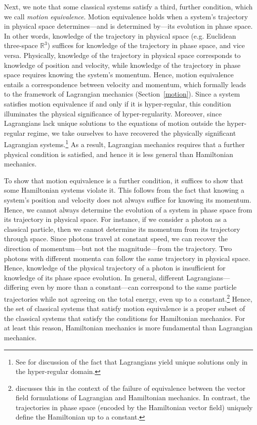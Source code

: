 \documentclass[12pt, twoside]{article}
\begin{document}
Next, we note that some classical systems satisfy a third, further condition, which we call \textit{motion equivalence}. Motion equivalence holds when a system's trajectory in physical space determines---and is determined by---its evolution in phase space. In other words, knowledge of the trajectory in physical space (e.g. Euclidean three-space $\mathbb{R}^3$) suffices for knowledge of the trajectory in phase space, and vice versa. Physically, knowledge of the trajectory in physical space corresponds to knowledge of position and velocity, while knowledge of the trajectory in phase space requires knowing the system's momentum. Hence, motion equivalence entails a correspondence between velocity and momentum, which formally leads to the framework of Lagrangian mechanics (Section~\ref{motion}). {\color{green} Since a system satisfies motion equivalence if and only if it is hyper-regular, this condition illuminates the physical significance of hyper-regularity. Moreover, since Lagrangians lack unique solutions to the equations of motion outside the hyper-regular regime, we take ourselves to have recovered the physically significant Lagrangian systems.}\footnote{{\color{green}See \textcites[119]{Gelfand} for discussion of the fact that Lagrangians yield unique solutions only in the hyper-regular domain.}} As a result, Lagrangian mechanics requires that a further physical condition is satisfied, and hence it is less general than Hamiltonian mechanics. 

To show that motion equivalence is a further condition, it suffices to show that some Hamiltonian systems violate it. This follows from the fact that knowing a system's position and velocity does not always suffice for knowing its momentum. Hence, we cannot always determine the evolution of a system in phase space from its trajectory in physical space. For instance, if we consider a photon as a classical particle, then we cannot determine its momentum from its trajectory through space. Since photons travel at constant speed, we can recover the direction of momentum---but not the magnitude---from the trajectory. Two photons with different momenta can follow the same trajectory in physical space. Hence, knowledge of the physical trajectory of a photon is insufficient for knowledge of its phase space evolution. In general, different Lagrangians---differing even by more than a constant---can correspond to the same particle trajectories while not agreeing on the total energy, even up to a constant.\footnote{\textcites[1185--1186]{Barrett2} discusses this in the context of the failure of equivalence between the vector field formulations of Lagrangian and Hamiltonian mechanics. In contrast, the trajectories in phase space (encoded by the Hamiltonian vector field) uniquely define the Hamiltonian up to a constant.} Hence, the set of classical systems that satisfy motion equivalence is a proper subset of the classical systems that satisfy the conditions for Hamiltonian mechanics. For at least this reason, Hamiltonian mechanics is more fundamental than Lagrangian mechanics.
\end{document}
